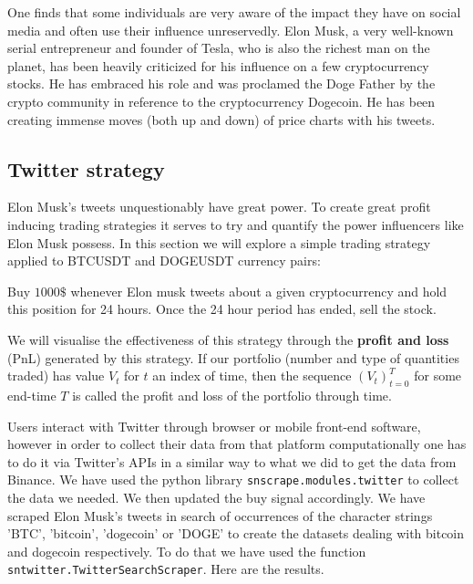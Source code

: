 \documentclass[twoside]{report}
\newcommand{\code}{\texttt}
\begin{document}
\begin{spacing}{1}
One finds that some individuals are very aware of the impact they have on social media and often use their influence unreservedly. Elon Musk, a very well-known serial entrepreneur and founder of Tesla, who is also the richest man on the planet, has been heavily criticized for his influence on a few cryptocurrency stocks. He has embraced his role and was proclamed the Doge Father by the crypto community in reference to the cryptocurrency Dogecoin. He has been creating immense moves (both up and down) of price charts with his tweets.

\subsection{Twitter strategy}
Elon Musk's tweets unquestionably have great power. To create great profit inducing trading strategies it serves to try and quantify the power influencers like Elon Musk possess. In this section we will explore a simple trading strategy applied to BTCUSDT and DOGEUSDT currency pairs: \begin{strategy}
Buy $1000\text{\$}$ whenever Elon musk tweets about a given cryptocurrency and hold this position for 24 hours. Once the 24 hour period has ended, sell the stock.
\end{strategy}\label{strat:musk} 
We will visualise the effectiveness of this strategy through the \textbf{profit and loss} (PnL) generated by this strategy. If our portfolio (number and type of quantities traded) has value $V_t$ for $t$ an index of time, then the sequence $(V_t)_{t=0}^T$ for some end-time $T$ is called the profit and loss of the portfolio through time.

Users interact with Twitter through browser or mobile front-end software, however in order to collect their data from that platform computationally one has to do it via Twitter's APIs in a similar way to what we did to get the data from Binance.
We have used the python library \code{snscrape.modules.twitter} to collect the data we needed. We then updated the buy signal accordingly. We have scraped Elon Musk's tweets in search of occurrences of the character strings 'BTC', 'bitcoin', 'dogecoin' or 'DOGE' to create the datasets dealing with bitcoin and dogecoin respectively. To do that we have used the function \code{sntwitter.TwitterSearchScraper}. Here are the results. \\


\end{spacing}
\end{document}
